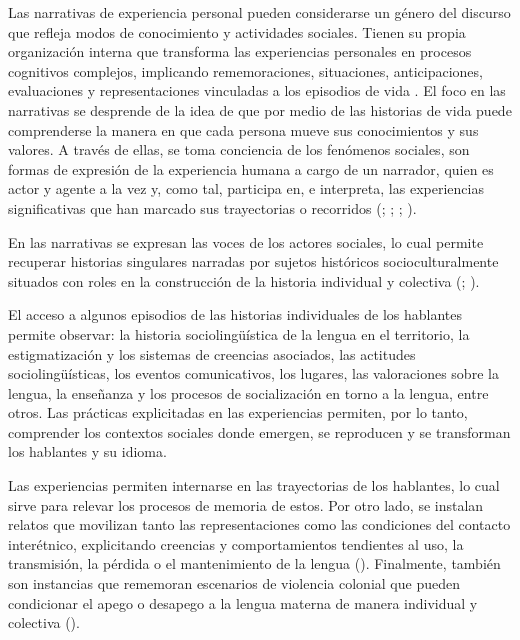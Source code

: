 \documentclass[output=paper]{../langscibook}
\begin{document}
Las narrativas de experiencia personal pueden considerarse un género del discurso que refleja modos de conocimiento y actividades sociales. Tienen su propia organización interna que transforma las experiencias personales en procesos cognitivos complejos, implicando rememoraciones, situaciones, anticipaciones, evaluaciones y representaciones vinculadas a los episodios de vida \citep{Ochs1996}. El foco en las narrativas se desprende de la idea de que por medio de las historias de vida puede comprenderse la manera en que cada persona mueve sus conocimientos y sus valores. A través de ellas, se toma conciencia de los fenómenos sociales, son formas de expresión de la experiencia humana a cargo de un narrador, quien es actor y agente a la vez y, como tal, participa en, e interpreta, las experiencias significativas que han marcado sus trayectorias o recorridos (\citealt{JovchelovitchBauer2005}; \citealt{BolognaniNacarato2015}; \citealt{Bertaux2010}; \citealt{Delory-Momberger2015}).

En las narrativas se expresan las voces de los actores sociales, lo cual permite recuperar historias singulares narradas por sujetos históricos socioculturalmente situados con roles en la construcción de la historia individual y colectiva (\citealt{DeSouza2010}; \citealt{Duranti2009}).

El acceso a algunos episodios de las historias individuales de los hablantes permite observar: la historia sociolingüística de la lengua en el territorio, la estigmatización y los sistemas de creencias asociados, las actitudes sociolingüísticas, los eventos comunicativos, los lugares, las valoraciones sobre la lengua, la enseñanza y los procesos de socialización en torno a la lengua, entre otros. Las prácticas explicitadas en las experiencias permiten, por lo tanto, comprender los contextos sociales donde emergen, se reproducen y se transforman los hablantes y su idioma.

Las experiencias permiten internarse en las trayectorias de los hablantes, lo cual sirve para relevar los procesos de memoria de estos. Por otro lado, se instalan relatos que movilizan tanto las representaciones como las condiciones del contacto interétnico, explicitando creencias y comportamientos tendientes al uso, la transmisión, la pérdida o el mantenimiento de la lengua (\citealt{WittigGonzálezFaríasCaballero2018}).  Finalmente, también son instancias que rememoran escenarios de violencia colonial que pueden condicionar el apego o desapego a la lengua materna de manera individual y colectiva (\citealt{ComunidaddeHistoriaMapuche2012,ComunidaddeHistoriaMapuche2015}).
\end{document}

